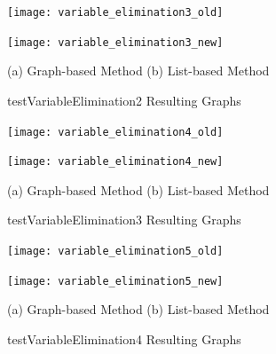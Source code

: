 \documentclass[12pt,openany,a4paper]{book}
\begin{document}
\begin{figure}[H]
    \begin{minipage}[l]{0.4\textwidth}
        \texttt{[image: variable\_elimination3\_old]}
    \end{minipage}
    \hspace{0.05\textwidth}
    \begin{minipage}[l]{0.6\textwidth}
        \texttt{[image: variable\_elimination3\_new]}
    \end{minipage}
    \hspace*{0.03\textwidth}
    (a) Graph-based Method
    \hspace{0.25\textwidth}
    (b) List-based Method
    \caption{testVariableElimination2 Resulting Graphs}
    \label{varelim2}
\end{figure}

\begin{figure}[H]
    \begin{minipage}[l]{0.4\textwidth}
        \texttt{[image: variable\_elimination4\_old]}
    \end{minipage}
    \hspace{0.05\textwidth}
    \begin{minipage}[l]{0.65\textwidth}
        \texttt{[image: variable\_elimination4\_new]}
    \end{minipage}
    \hspace*{0.03\textwidth}
    (a) Graph-based Method
    \hspace{0.25\textwidth}
    (b) List-based Method
    \caption{testVariableElimination3 Resulting Graphs}
    \label{varelim3}
\end{figure}

\begin{figure}[H]
    \begin{minipage}[l]{0.4\textwidth}
        \texttt{[image: variable\_elimination5\_old]}
    \end{minipage}
    \hspace{0.05\textwidth}
    \begin{minipage}[l]{0.6\textwidth}
        \texttt{[image: variable\_elimination5\_new]}
    \end{minipage}
    \hspace*{0.03\textwidth}
    (a) Graph-based Method
    \hspace{0.25\textwidth}
    (b) List-based Method
    \caption{testVariableElimination4 Resulting Graphs}
    \label{varelim4}
\end{figure}
\end{document}
